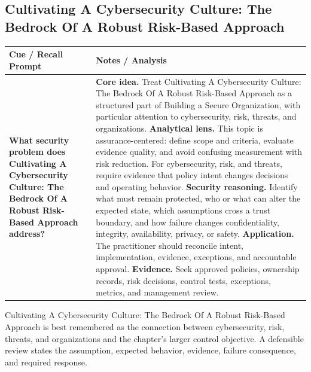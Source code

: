 \documentclass[11pt]{article}
\newcommand{\CornellHeader}{%
\rowcolor{Navy}\color{white}\bfseries Cue / Recall Prompt & \color{white}\bfseries Notes / Analysis\\\hline}
\newcommand{\CornellRow}[2]{%
\cellcolor{CueGray}\RaggedRight\textbf{#1} & \RaggedRight #2\\\hline}
\begin{document}
\subsection*{Cultivating A Cybersecurity Culture: The Bedrock Of A Robust Risk-Based Approach}
\begin{longtable}{>{\RaggedRight\arraybackslash}p{}|>{\RaggedRight\arraybackslash}p{}}
\CornellHeader
\CornellRow{What security problem does Cultivating A Cybersecurity Culture: The Bedrock Of A Robust Risk-Based Approach address?}{\textbf{Core idea.} Treat Cultivating A Cybersecurity Culture: The Bedrock Of A Robust Risk-Based Approach as a structured part of Building a Secure Organization, with particular attention to cybersecurity, risk, threats, and organizations. \textbf{Analytical lens.} This topic is assurance-centered: define scope and criteria, evaluate evidence quality, and avoid confusing measurement with risk reduction. For cybersecurity, risk, and threats, require evidence that policy intent changes decisions and operating behavior. \textbf{Security reasoning.} Identify what must remain protected, who or what can alter the expected state, which assumptions cross a trust boundary, and how failure changes confidentiality, integrity, availability, privacy, or safety. \textbf{Application.} The practitioner should reconcile intent, implementation, evidence, exceptions, and accountable approval. \textbf{Evidence.} Seek approved policies, ownership records, risk decisions, control tests, exceptions, metrics, and management review.}
\end{longtable}
\begin{topicsummary}
Cultivating A Cybersecurity Culture: The Bedrock Of A Robust Risk-Based Approach is best remembered as the connection between cybersecurity, risk, threats, and organizations and the chapter's larger control objective. A defensible review states the assumption, expected behavior, evidence, failure consequence, and required response.
\end{topicsummary}
\end{document}
